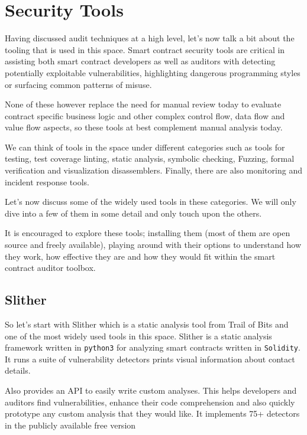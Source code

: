 \section{Security Tools}\label{security-tools}

Having discussed audit techniques at a high level, let's now talk a bit
about the tooling that is used in this space. Smart contract security
tools are critical in assisting both smart contract developers as well
as auditors with detecting potentially exploitable vulnerabilities,
highlighting dangerous programming styles or surfacing common patterns
of misuse.

None of these however replace the need for manual review today to
evaluate contract specific business logic and other complex control
flow, data flow and value flow aspects, so these tools at best
complement manual analysis today.

We can think of tools in the space under different categories such as
tools for testing, test coverage linting, static analysis, symbolic
checking, Fuzzing, formal verification and visualization disassemblers.
Finally, there are also monitoring and incident response tools.

Let's now discuss some of the widely used tools in these categories. We
will only dive into a few of them in some detail and only touch upon the
others.

It is encouraged to explore these tools; installing them (most of them
are open source and freely available), playing around with their options
to understand how they work, how effective they are and how they would
fit within the smart contract auditor toolbox.

\subsection{Slither}\label{slither}

So let's start with Slither which is a static analysis tool from Trail
of Bits and one of the most widely used tools in this space. Slither is
a static analysis framework written in \texttt{python3} for analyzing
smart contracts written in \texttt{Solidity}. It runs a suite of
vulnerability detectors prints visual information about contact details.

Also provides an API to easily write custom analyses. This helps
developers and auditors find vulnerabilities, enhance their code
comprehension and also quickly prototype any custom analysis that they
would like. It implements 75+ detectors in the publicly available free
version

